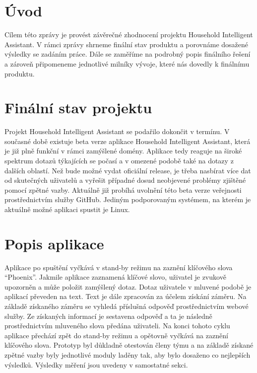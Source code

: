 \documentclass[12pt,a4paper]{article}
\begin{document}
\newpage
\pagestyle{plain}     %
\setcounter{page}{1}
\addtolength{\voffset}{-3cm}
\addtolength{\headheight}{2cm}

\pagestyle{fancy}
\lfoot{}
\cfoot{\thepage}
\rfoot{}
\renewcommand{\headrulewidth}{0.4pt}

\tableofcontents

\newpage
\section{Úvod}
Cílem této zprávy je provést závěrečné zhodnocení projektu Household Intelligent Assistant. V rámci zprávy shrneme finální stav produktu a porovnáme dosažené výsledky se zadáním práce. Dále se zaměříme na podrobný popis finálního řešení a zároveň připomeneme jednotlivé milníky vývoje, které nás dovedly k finálnímu produktu. 
\section{Finální stav projektu}
Projekt Household Intelligent Assistant se podařilo dokončit v termínu. V současné době existuje beta verze aplikace Household Intelligent Assistant, která je již plně funkční v rámci zamýšlené domény. Aplikace tedy reaguje na široké spektrum dotazů týkajících se počasí a v omezené podobě také na dotazy z dalších oblastí. Než bude možné vydat oficiální release, je třeba nasbírat více dat od skutečných uživatelů a vyřešit případné dosud neobjevené problémy zjištěné pomocí zpětné vazby. Aktuálně již probíhá uvolnění této beta verze veřejnosti prostřednictvím služby GitHub. Jediným podporovaným systémem, na kterém je aktuálně možné aplikaci spustit je Linux. 
\section{Popis aplikace}
Aplikace po spuštění vyčkává v stand-by režimu na zaznění klíčového slova “Phoenix”. Jakmile aplikace zaznamená klíčové slovo, uživatel je zvukově upozorněn a může položit zamýšlený dotaz. Dotaz uživatele v mluvené podobě je aplikací převeden na text. Text je dále zpracován za účelem získání záměru. Na základě získaného záměru se vyhledá příslušná odpověď prostřednictvím webové služby. Ze získaných informací je sestavena odpověď a ta je následně prostřednictvím mluveného slova předána uživateli. Na konci tohoto cyklu aplikace  přechází zpět do stand-by režimu a opětovně vyčkává na zaznění klíčového slova.
Prototyp byl důkladně otestován členy týmu a na základě získané zpětné vazby byly jednotlivé moduly laděny tak, aby bylo dosaženo co nejlepších výsledků. Výsledky měření jsou uvedeny v samostatné sekci.
\end{document}
